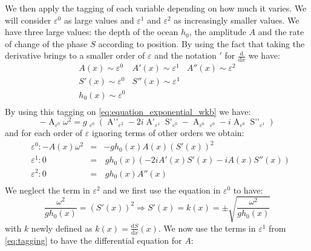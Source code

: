 We then apply the tagging of each variable depending on how much it varies. We will consider $\varepsilon ^0$ as large values and $\varepsilon^1$ and $\varepsilon^2$ as increasingly smaller values. We have three large values: the depth of the ocean $h_0$, the amplitude $A$ and the rate of change of the phase $S$ according to position. By using the fact that taking the derivative brings to a smaller order of $\varepsilon$ and the notation $'$ for $\frac{\mathrm{d}}{\mathrm{d}x}$ we have:
\begin{equation}
    \begin{array}{rrr}
        A(x) \sim \varepsilon^0 & A'(x) \sim \varepsilon^1 & A''(x) \sim \varepsilon^2 \\
        S'(x) \sim \varepsilon^0 & S''(x) \sim \varepsilon^1 & \\
        h_0(x) \sim \varepsilon^0 & & \\
    \end{array}
\end{equation}
By using this tagging on \autoref{eq:equation_exponential_wkb} we have:
\begin{equation}
    -\mathop{A(x)}_{\varepsilon^0}\omega^2 = g\mathop{h_0(x)}_{\varepsilon^0} \left(\mathop{A''(x)}_{\varepsilon^2} - 2i \mathop{A'(x)}_{\varepsilon^1}\mathop{S'(x)}_{\varepsilon^0} - \mathop{A(x)}_{\varepsilon^0}\mathop{\left(S'(x)\right)^2}_{\varepsilon^0} - i\mathop{A(x)}_{\varepsilon^0}\mathop{S''(x)}_{\varepsilon^1}\right)
\end{equation}
and for each order of $\varepsilon$ ignoring terms of other orders we obtain:
\begin{equation}
    \begin{aligned}
        &\varepsilon^0: -A(x)\omega^2 & = & -gh_0(x)A(x)(S'(x))^2 \\
        &\varepsilon^1: 0 & = & \, gh_0(x)(-2iA'(x)S'(x) - iA(x)S''(x)) \\
        &\varepsilon^2: 0 & = & \, gh_0(x) A''(x) \\
    \end{aligned}
    \label{eq:tagging}
\end{equation}
We neglect the term in $\varepsilon^2$ and we first use the equation in $\varepsilon^0$ to have:
\begin{equation}
    \frac{\omega^2}{gh_0(x)} = (S'(x))^2 \Rightarrow S'(x) = k(x) = \pm \sqrt{\frac{\omega^2}{gh_0(x)}}
    \label{eq:s_prime}
\end{equation}
with $k$ newly defined as $k(x) = \frac{\mathrm{d} S}{\mathrm{d}x}(x)$. We now use the terms in $\varepsilon^1$ from \autoref{eq:tagging} to have the differential equation for $A$:
